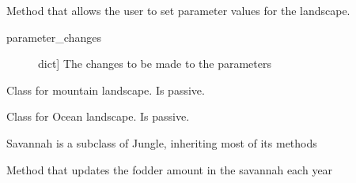 \documentclass[a4paper,10pt,english]{sphinxmanual}
\begin{document}
\begin{fulllineitems}
\begin{fulllineitems}
\end{fulllineitems}


\begin{fulllineitems}
\label{\detokenize{landscape:biosim.landscape.Jungle.set_parameters}}
Method that allows the user to set parameter values for the landscape.
\begin{description}
\item[{parameter\_changes}] \leavevmode{[}dict{]}
The changes to be made to the parameters

\end{description}

\end{fulllineitems}


\end{fulllineitems}


\begin{fulllineitems}
\label{\detokenize{landscape:biosim.landscape.Mountain}}
Class for mountain landscape. Is passive.

\end{fulllineitems}


\begin{fulllineitems}
\label{\detokenize{landscape:biosim.landscape.Ocean}}
Class for Ocean landscape. Is passive.

\end{fulllineitems}


\begin{fulllineitems}
\label{\detokenize{landscape:biosim.landscape.Savannah}}
Savannah is a subclass of Jungle, inheriting most of its methods

\begin{fulllineitems}
\label{\detokenize{landscape:biosim.landscape.Savannah.reset_fodder}}
Method that updates the fodder amount in the savannah each year

\end{fulllineitems}


\end{fulllineitems}
\end{document}
